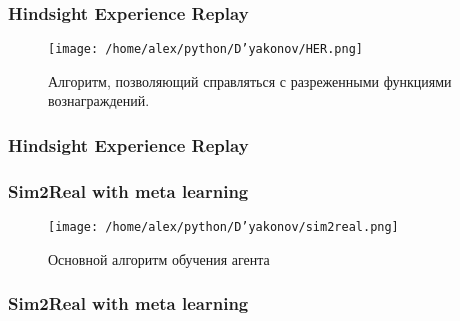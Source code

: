 \documentclass[fleqn, xcolor=x11names]{beamer}
\begin{document}
\begin{frame}\frametitle{Hindsight Experience Replay}

\begin{figure}[h]
\begin{center}
\texttt{[image: /home/alex/python/D'yakonov/HER.png]}
\caption{ Алгоритм, позволяющий справляться с разреженными функциями вознаграждений.}
\end{center}
\end{figure}

\end{frame}


\begin{frame}\frametitle{Hindsight Experience Replay}
\begin{center}
\end{center}
\end{frame}

\begin{frame}\frametitle{Sim2Real with meta learning}

\begin{figure}[h]
\begin{center}
\texttt{[image: /home/alex/python/D'yakonov/sim2real.png]}
\caption{ Основной алгоритм обучения агента}
\end{center}
\end{figure}

\end{frame}

\begin{frame}\frametitle{Sim2Real with meta learning}
\begin{center}
\end{center}
\end{frame}
\end{document}
